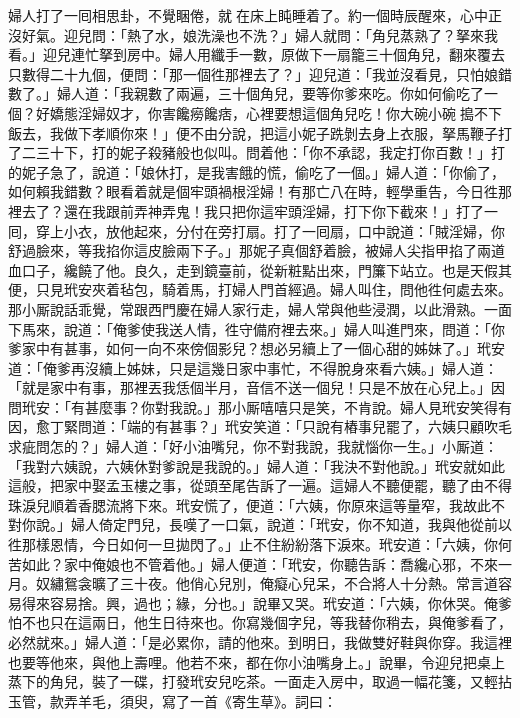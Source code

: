 婦人打了一囘相思卦，不覺睏倦，就𢱉在床上盹睡着了。約一個時辰醒來，心中正沒好氣。{}迎兒問：「熱了水，娘洗澡也不洗？」婦人就問：「角兒蒸熟了？拏來我看。」迎兒連忙拏到房中。婦人用纖手一數，原做下一扇籠三十個角兒，翻來覆去只數得二十九個，便問：「那一個徃那裡去了？」迎兒道：「我並沒看見，只怕娘錯數了。」婦人道：「我親數了兩遍，三十個角兒，要等你爹來吃。你如何偷吃了一個？好嬌態淫婦奴才，{}你害饞癆饞痞，心裡要想這個角兒吃！你大碗小碗𠳹搗不下飯去，我做下孝順你來！」便不由分說，把這小妮子跣剝去身上衣服，拏馬鞭子打了二三十下，打的妮子殺豬般也似叫。問着他：「你不承認，我定打你百數！」打的妮子急了，說道：「娘休打，是我害餓的慌，偷吃了一個。」婦人道：「你偷了，如何賴我錯數？眼看着就是個牢頭禍根淫婦！有那亡八在時，輕學重告，今日徃那裡去了？還在我跟前弄神弄鬼！{}我只把你這牢頭淫婦，打下你下截來！」打了一囘，穿上小衣，放他起來，分付在旁打扇。打了一囘扇，口中說道：「賊淫婦，你舒過臉來，等我掐你這皮臉兩下子。」那妮子真個舒着臉，被婦人尖指甲掐了兩道血口子，{}纔饒了他。良久，走到鏡臺前，從新粧點出來，門簾下站立。也是天假其便，只見玳安夾着毡包，騎着馬，打婦人門首經過。婦人叫住，問他徃何處去來。那小厮說話乖覺，常跟西門慶在婦人家行走，婦人常與他些浸潤，以此滑熟。一面下馬來，說道：「俺爹使我送人情，徃守備府裡去來。」婦人叫進門來，問道：「你爹家中有甚事，如何一向不來傍個影兒？想必另續上了一個心甜的姊妹了。」玳安道：「俺爹再沒續上姊妹，只是這幾日家中事忙，不得脫身來看六姨。」婦人道：「就是家中有事，那裡丟我恁個半月，音信不送一個兒！只是不放在心兒上。」因問玳安：「有甚麼事？你對我說。」那小厮嘻嘻只是笑，不肯說。{}婦人見玳安笑得有因，愈丁緊問道：「端的有甚事？」玳安笑道：「只說有樁事兒罷了，六姨只顧吹毛求疵問怎的？」婦人道：「好小油嘴兒，你不對我說，我就惱你一生。」{}小厮道：「我對六姨說，六姨休對爹說是我說的。」婦人道：「我決不對他說。」玳安就如此這般，把家中娶孟玉樓之事，從頭至尾告訴了一遍。這婦人不聽便罷，聽了由不得珠淚兒順着香腮流將下來。玳安慌了，便道：「六姨，你原來這等量窄，我故此不對你說。」婦人倚定門兒，長嘆了一口氣，說道：「玳安，你不知道，我與他從前以徃那樣恩情，今日如何一旦拋閃了。」止不住紛紛落下淚來。玳安道：「六姨，你何苦如此？家中俺娘也不管着他。」婦人便道：「玳安，你聽告訴：喬纔心邪，不來一月。奴繡鴛衾曠了三十夜。他俏心兒別，俺癡心兒呆，不合將人十分熱。常言道容易得來容易捨。興，過也；緣，分也。」說畢又哭。玳安道：「六姨，你休哭。俺爹怕不也只在這兩日，他生日待來也。你寫幾個字兒，等我替你稍去，與俺爹看了，必然就來。」婦人道：「是必累你，請的他來。到明日，我做雙好鞋與你穿。我這裡也要等他來，與他上壽哩。他若不來，都在你小油嘴身上。」說畢，令迎兒把桌上蒸下的角兒，裝了一碟，打發玳安兒吃茶。一面走入房中，取過一幅花箋，又輕拈玉管，款弄羊毛，須臾，寫了一首《寄生草》。詞曰：

